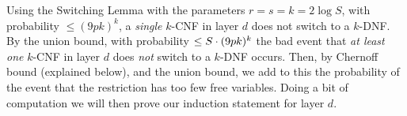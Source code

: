 

Using the Switching Lemma with the parameters \( r = s = k = 2 \log S \), with probability \( \leq (9pk)^k \), a \emph{single} $k$-CNF in layer \( d \) does not switch to a $k$-DNF.
By the union bound, with probability \( \leq S\cdot(9pk)^k \) the bad event that \emph{at least one} $k$-CNF in layer \( d \) does \emph{not} switch to a $k$-DNF occurs.
Then, by Chernoff bound (explained below), and the union bound, we add to this the probability of the event that the restriction has too few free variables.
Doing a bit of computation we will then prove our induction statement for layer $d$.



